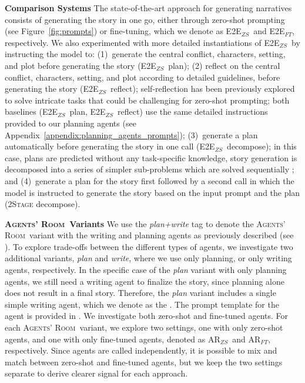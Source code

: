 \documentclass{article}
\newcommand{\Agentsroom}{\textsc{Agents' Room}}
\newcommand{\agentsroomzs}{{\sc AR$_{ZS}$}}
\newcommand{\agentsroomft}{{\sc AR$_{FT}$}}
\newcommand{\baselinezs}{{\sc E2E$_{ZS}$}}
\newcommand{\baselineft}{{\sc E2E$_{FT}$}}
\begin{document}
\textbf{Comparison Systems} 
The state-of-the-art approach for generating narratives consists of
generating the story in one go, either through zero-shot prompting
(see Figure~\ref{fig:prompts}) or fine-tuning, which we denote as
\baselinezs\ and \baselineft, respectively.  We also experimented with
more detailed instantiations of \baselinezs\ by instructing the model
to: (1)~generate the central conflict, characters, setting, and plot
before generating the story (\baselinezs\ plan); (2) reflect on the
central conflict, characters, setting, and plot according to detailed
guidelines, before generating the story (\baselinezs\ reflect);
self-reflection \citep{Madaan:ea:2023,Shinn:ea:2023} has been
previously explored to solve intricate tasks that could be challenging
for zero-shot prompting; both baselines (\baselinezs\ plan,
\baselinezs\ reflect) use the same detailed instructions provided to
our planning agents (see
Appendix~\ref{appendix:planning_agents_prompts}); (3)~generate a plan
automatically before generating the story in one call (\baselinezs\
decompose); in this case, plans are predicted without any
task-specific knowledge, story generation is decomposed into a series
of simpler sub-problems which are solved sequentially
\citep{yang-etal-2022-re3,Khot:ea:2023}; and (4)~generate a
plan for the story first followed by a second call in which the model
is instructed to generate the story based on the input prompt and the
plan (\textsc{2Stage} decompose). 



\textbf{\Agentsroom\ Variants} We use the {\it plan+write} tag to denote the \Agentsroom\ variant with the writing and planning agents as previously described (see ). To  explore trade-offs between the different types of agents, we investigate two additional variants, {\it plan} and {\it write}, where we use only planning, or only writing agents, respectively. In the specific case of the {\it plan} variant with only  planning agents, we still need a writing agent to finalize the story, since planning alone does not result in a final story. Therefore, the {\it plan} variant includes a single simple writing agent,  which we denote as the {\sc [finalizer]}. The prompt template for the  {\sc [finalizer]} agent is provided in . We investigate both zero-shot and fine-tuned agents. For each \Agentsroom\ variant, we explore two settings, one with only zero-shot agents, and one with only fine-tuned agents,  denoted as \agentsroomzs\ and \agentsroomft, respectively. Since agents are called independently, it is possible to mix and match between zero-shot and fine-tuned agents, but we keep the two settings separate to derive clearer signal for each approach.
\end{document}
